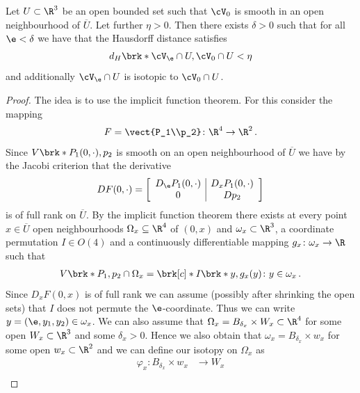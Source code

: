 \begin{proposition}\label{pr:n3_polynomial_convergenceSmoothSet}
  Let $U\subset\R^3$ be an open bounded set such that $\cV_0$ is smooth
  in an open neighbourhood of $\overline{U}$. Let further $\eta>0$.
  Then there exists $\delta>0$ such that for all $\e<\delta$ we have that the Hausdorff distance
  satisfies
  \begin{align*}
    d_H\brk*{\cV_\e\cap U,\cV_0\cap U}<\eta
  \end{align*}
  and additionally $\cV_\e\cap U$ is isotopic to $\cV_0\cap U$.
\end{proposition}
\begin{proof}
  The idea is to use the implicit function theorem. For this consider the mapping
  \begin{align*}
    F=\vect{P_1\\p_2}\colon \R^4\to\R^2\,.
  \end{align*}
  Since $V\brk*{P_1(0,\cdot),p_2}$ is smooth on an open neighbourhood of $\overline{U}$
  we have by the Jacobi criterion that the derivative
  \begin{align}
    DF(0,\cdot) = \left[\begin{array}{c|c}
        D_\e P_1(0,\cdot)&D_x P_1(0,\cdot)\\
        0&D p_2
      \end{array}\right]\label{eq:n3_polynomial_homotopic_df}
  \end{align}
  is of full rank on $\overline{U}$.
  By the implicit function theorem there exists at every point $x\in\overline{U}$ open neighbourhoods
  $\Omega_x\subseteq \R^4$ of $(0,x)$ and $\omega_x\subset\R^3$, a coordinate permutation $I\in O(4)$
  and a continuously differentiable mapping $g_x\colon\omega_x\to\R$ such that
  \begin{align*}
    V\brk*{P_1,p_2}\cap \Omega_x=\brk[c]*{I\brk*{y,g_x(y)}\colon y\in\omega_x}\,.
  \end{align*}
  Since $D_xF(0,x)$ is of full rank we can assume (possibly after shrinking the open sets) that $I$ does not permute the $\e$-coordinate.
  Thus we can write $y=(\e,y_1,y_2)\in\omega_x$.
  We can also assume that $\Omega_x=B_{\delta_x}\times W_x\subset\R^4$ for some open $W_x\subset\R^3$ and 
  some $\delta_x>0$.
  Hence we also obtain that $\omega_x=B_{\delta_x}\times w_x$ for some open $w_x\subset\R^2$ and we can define our
  isotopy on $\Omega_x$ as
  \begin{align*}
    \varphi_x\colon B_{\delta_x}\times w_x&\to W_x\\

\end{align*}
\end{proof}
